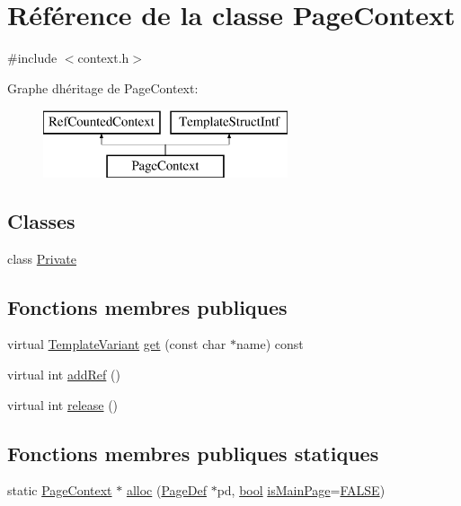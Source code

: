 \hypertarget{class_page_context}{}\section{Référence de la classe Page\+Context}
\label{class_page_context}


{\ttfamily \#include $<$context.\+h$>$}

Graphe d\textquotesingle{}héritage de Page\+Context\+:\begin{figure}[H]
\begin{center}
\leavevmode
\includegraphics[height=2.000000cm]{class_page_context}
\end{center}
\end{figure}
\subsection*{Classes}
\begin{DoxyCompactItemize}
\item 
class \hyperlink{class_page_context_1_1_private}{Private}
\end{DoxyCompactItemize}
\subsection*{Fonctions membres publiques}
\begin{DoxyCompactItemize}
\item 
virtual \hyperlink{class_template_variant}{Template\+Variant} \hyperlink{class_page_context_ac5296c46e54a42676fc505887115b6e8}{get} (const char $\ast$name) const 
\item 
virtual int \hyperlink{class_page_context_a70ce0b0a5fb9f2899053fddc2543f823}{add\+Ref} ()
\item 
virtual int \hyperlink{class_page_context_a7606be03a79df97def92c6bde9383f3c}{release} ()
\end{DoxyCompactItemize}
\subsection*{Fonctions membres publiques statiques}
\begin{DoxyCompactItemize}
\item 
static \hyperlink{class_page_context}{Page\+Context} $\ast$ \hyperlink{class_page_context_af281220c0628d73e697342b89aa4ef7e}{alloc} (\hyperlink{class_page_def}{Page\+Def} $\ast$pd, \hyperlink{qglobal_8h_a1062901a7428fdd9c7f180f5e01ea056}{bool} \hyperlink{index_8h_aec03800047ada46460eb75113cfee322ad124df548e4254793c5f5d59fcc31484}{is\+Main\+Page}=\hyperlink{qglobal_8h_a10e004b6916e78ff4ea8379be80b80cc}{F\+A\+L\+S\+E})
\end{DoxyCompactItemize}


